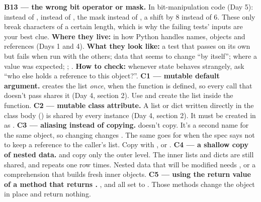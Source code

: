 \documentclass[10pt,a4paper]{article}
\begin{document}
\textbf{B13 — the wrong bit operator or mask.} In bit-manipulation code (Day 5): \code{\textbar{}\allowbreak{}} instead of \code{\&\allowbreak{}}, \code{\textless{}\allowbreak{}\textless{}\allowbreak{}} instead of \code{\textgreater{}\allowbreak{}\textgreater{}\allowbreak{}}, the mask  instead of , a shift by 8 instead of 6. These only break characters of a certain length, which is why the failing tests’ inputs are your best clue.
\textbf{Where they live:} in how Python handles names, objects and references (Days 1 and 4).
\textbf{What they look like:} a test that passes on its own but fails when run with the others; data that seems to change “by itself”;  where a value was expected; ; .
\textbf{How to check:} whenever state behaves strangely, ask “who else holds a reference to this object?”.
\textbf{C1 — mutable default argument.}  creates the list \emph{once}, when the function is defined, so every call that doesn’t pass  shares it (Day 4, section 2). Use  and create the list inside the function.
\textbf{C2 — mutable class attribute.} A list or dict written directly in the class body () is shared by every instance (Day 4, section 2). It must be created in  as .
\textbf{C3 — aliasing instead of copying.}  doesn’t copy. It’s a second name for the same object, so changing  changes . The same goes for  when the spec says not to keep a reference to the caller’s list. Copy with ,  or .
\textbf{C4 — a shallow copy of nested data.}  and  copy only the outer level. The inner lists and dicts are still shared, and  repeats one row  times. Nested data that will be modified needs , or a comprehension that builds fresh inner objects.
\textbf{C5 — using the return value of a method that returns .} ,  and  all set  to . Those methods change the object in place and return nothing.
\end{document}
